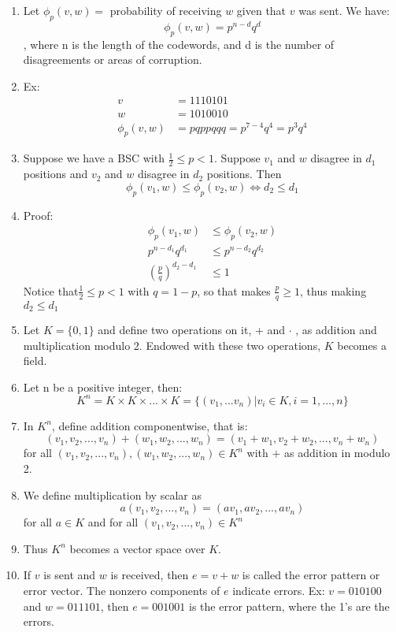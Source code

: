 \documentclass[11pt]{article}
\begin{document}
	\begin{enumerate}
		\item Let $\phi_p(v,w) =$ probability of receiving $w$ given that $v$ was sent. We have:
			$$\phi_p(v,w) = p^{n-d}q^{d}$$,
		where n is the length of the codewords, and d is the number of disagreements or areas of corruption.  
		\item Ex: 
		\begin{align*}
			v &= 1110101 \\
			w &= 1010010 \\
			\phi_p(v,w) &= pqppqqq = p^{7-4}q^{4} = p^3q^4			
		\end{align*}
		\item Suppose we have a BSC with $\frac{1}{2} \leq p < 1$. Suppose $v_1$ and $w$ disagree in $d_1$ positions and $v_2$ and $w$ disagree in $d_2$ positions. Then
		$$\phi_p(v_1,w) \leq \phi_p(v_2,w) \Longleftrightarrow d_2 \leq d_1$$
		\item Proof:
			\begin{align*}
				\phi_p(v_1,w) &\leq \phi_p(v_2,w) \\
				p^{n-d_1}q^{d_1} &\leq  p^{n-d_2}q^{d_2} \\
				\left(\frac{p}{q}\right)^{d_2 - d_1} &\leq 1
			\end{align*}
		Notice that$\frac{1}{2} \leq p < 1$ with $q = 1-p$, so that makes $\frac{p}{q} \geq 1$, thus making $d_2 \leq d_1$ 
		\item Let $K = \{0,1\}$ and define two operations on it, + and $\cdot$ , as addition and multiplication modulo 2.  Endowed with these two operations, $K$ becomes a field.
		\item Let n be a positive integer, then:
			$$K^n = K \times K \times ... \times K = \{(v_1,...v_n) | v_i \in K, i = 1, ..., n\}$$
		\item In $K^n$, define addition componentwise, that is:
		$$(v_1, v_2, ..., v_n) + (w_1, w_2, ..., w_n) = (v_1+w_1, v_2+w_2, ..., v_n+w_n)$$
		for all $(v_1, v_2, ..., v_n), (w_1, w_2, ..., w_n) \in K^n$ with $+$ as addition in modulo 2. 
		\item We define multiplication by scalar as 
		$$a(v_1, v_2, ..., v_n) = (av_1, av_2, ..., av_n)$$ 
		for all $a \in K$ and for all $(v_1, v_2, ..., v_n) \in K^n$
		\item Thus $K^n$ becomes a vector space over $K$.
		\item If $v$ is sent and $w$ is received, then $e = v + w$ is called the error pattern or error vector. The nonzero components of $e$ indicate errors. Ex: $v = 010100$ and $w = 011101$, then $e = 001001$ is the error pattern, where the 1's are the errors.

\end{enumerate}
\end{document}
